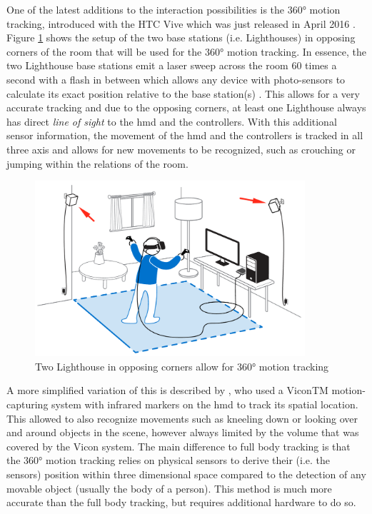 One of the latest additions to the interaction possibilities is the 360° motion tracking, introduced with the HTC Vive which was just released in April 2016 \citep{Htcvive2016}. Figure \ref{fig:lighthouses} shows the setup of the two base stations (i.e. Lighthouses) in opposing corners of the room that will be used for the 360° motion tracking. In essence, the two Lighthouse base stations emit a laser sweep across the room 60 times a second with a flash in between which allows any device with photo-sensors to calculate its exact position relative to the base station(s) \citep{Gizmodo2015}. This allows for a very accurate tracking and due to the opposing corners, at least one Lighthouse always has direct \textit{line of sight} to the \gls{hmd} and the controllers. \newline
With this additional sensor information, the movement of the \gls{hmd} and the controllers is tracked in all three axis and allows for new movements to be recognized, such as crouching or jumping within the relations of the room.
\begin{figure}[h]
	\begin{center}
		\includegraphics[width=10cm]{03_Figures/05_LitReview/HTCCorp2016_LighthouseRoomScale.png}
		\caption[Two Lighthouse in opposing corners allow for 360° motion tracking]{Two Lighthouse in opposing corners allow for 360° motion tracking \citep{HTCCorp2016}}
		\label{fig:lighthouses}
	\end{center}
\end{figure} \newline
A more simplified variation of this is described by \cite{Donalek2014}, who used a ViconTM motion-capturing system with infrared markers on the \gls{hmd} to track its spatial location. This allowed \cite{Donalek2014} to also recognize movements such as kneeling down or looking over and around objects in the scene, however always limited by the volume that was covered by the Vicon system. \newline
The main difference to full body tracking is that the 360° motion tracking relies on physical sensors to derive their (i.e. the sensors) position within three dimensional space compared to the detection of any movable object (usually the body of a person). This method is much more accurate than the full body tracking, but requires additional hardware to do so.


